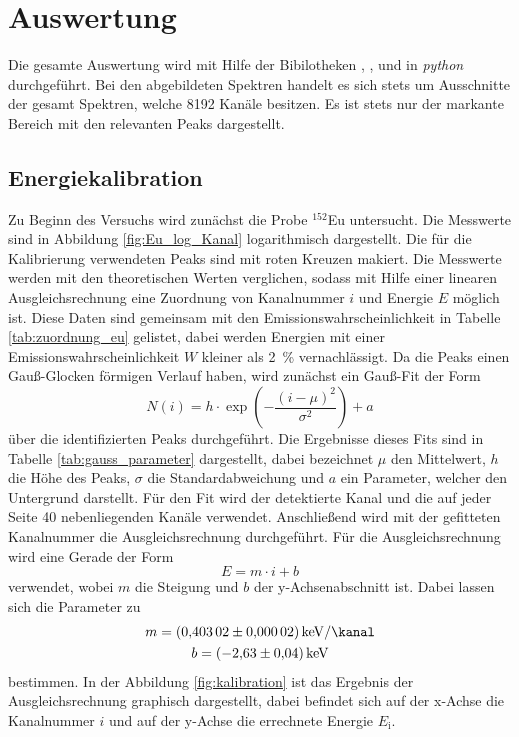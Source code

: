 \newpage
\section{Auswertung}
\label{sec:Auswertung}
Die gesamte Auswertung wird mit Hilfe der Bibilotheken \cite{matplotlib}, \cite{numpy}, \cite{scipy} und
\cite{uncertainties} in \textit{python} durchgeführt. Bei den abgebildeten Spektren handelt es sich stets um 
Ausschnitte der gesamt Spektren, welche \num{8192} Kanäle besitzen. Es ist stets nur der markante Bereich
mit den relevanten Peaks dargestellt.


\subsection{Energiekalibration}
\label{sec:Energiekalibration}
Zu Beginn des Versuchs wird zunächst die Probe ${}^{152}$Eu untersucht. Die Messwerte
sind in Abbildung \ref{fig:Eu_log_Kanal} logarithmisch dargestellt.
Die für die Kalibrierung verwendeten Peaks sind mit roten Kreuzen makiert. Die Messwerte
werden mit den theoretischen Werten \cite{referenz1} verglichen, sodass mit Hilfe einer linearen Ausgleichsrechnung
eine Zuordnung von Kanalnummer $i$ und Energie $E$ möglich ist. Diese Daten sind
gemeinsam mit den Emissionswahrscheinlichkeit in Tabelle \ref{tab:zuordnung_eu}
gelistet, dabei werden Energien mit einer Emissionswahrscheinlichkeit $W$
kleiner als \SI{2}{\percent} vernachlässigt.
Da die Peaks einen Gauß-Glocken förmigen Verlauf haben, wird zunächst ein Gauß-Fit der Form
\begin{equation}
  N(i) = h \cdot \exp{\left(-\frac{\left(i - \mu\right)^2}{\sigma^2}\right)} + a
\end{equation}
über die identifizierten Peaks durchgeführt. Die Ergebnisse dieses Fits sind in Tabelle \ref{tab:gauss_parameter}
dargestellt, dabei bezeichnet $\mu$ den Mittelwert, $h$ die Höhe des Peaks, $\sigma$ die Standardabweichung und 
$a$ ein Parameter, welcher den Untergrund darstellt. Für den Fit wird der detektierte Kanal und die auf jeder Seite 
\num{40} nebenliegenden Kanäle verwendet. Anschließend wird mit der gefitteten Kanalnummer die Ausgleichsrechnung
durchgeführt. Für die Ausgleichsrechnung wird eine Gerade der Form
\begin{equation}
  E = m \cdot i + b
\end{equation}
verwendet, wobei $m$ die Steigung und $b$ der y-Achsenabschnitt ist. Dabei lassen sich die Parameter zu
\begin{gather*}
  m = \SI{0.40302(2)}{\kilo\electronvolt\per\kanal} \\
  b = \SI{-2.63(4)}{\kilo\electronvolt}
\end{gather*}
bestimmen.
In der Abbildung \ref{fig:kalibration} ist das Ergebnis der Ausgleichsrechnung graphisch
dargestellt, dabei befindet sich auf der x-Achse die Kanalnummer $i$ und auf der
y-Achse die errechnete Energie $E_\text{i}$.


